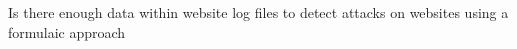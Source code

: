 
Is there enough data within website log files to detect attacks  on websites using a formulaic approach

